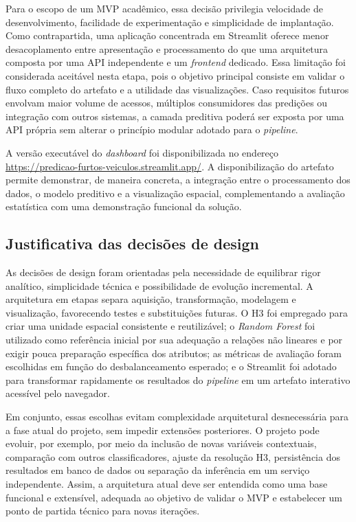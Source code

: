 \documentclass[12pt]{article}
\begin{document}
Para o escopo de um MVP acadêmico, essa decisão privilegia velocidade de desenvolvimento, facilidade de experimentação e simplicidade de implantação. Como contrapartida, uma aplicação concentrada em Streamlit oferece menor desacoplamento entre apresentação e processamento do que uma arquitetura composta por uma API independente e um \textit{frontend} dedicado. Essa limitação foi considerada aceitável nesta etapa, pois o objetivo principal consiste em validar o fluxo completo do artefato e a utilidade das visualizações. Caso requisitos futuros envolvam maior volume de acessos, múltiplos consumidores das predições ou integração com outros sistemas, a camada preditiva poderá ser exposta por uma API própria sem alterar o princípio modular adotado para o \textit{pipeline}.

A versão executável do \textit{dashboard} foi disponibilizada no endereço \url{https://predicao-furtos-veiculos.streamlit.app/}. A disponibilização do artefato permite demonstrar, de maneira concreta, a integração entre o processamento dos dados, o modelo preditivo e a visualização espacial, complementando a avaliação estatística com uma demonstração funcional da solução.

\subsection{Justificativa das decisões de design}
As decisões de design foram orientadas pela necessidade de equilibrar rigor analítico, simplicidade técnica e possibilidade de evolução incremental. A arquitetura em etapas separa aquisição, transformação, modelagem e visualização, favorecendo testes e substituições futuras. O H3 foi empregado para criar uma unidade espacial consistente e reutilizável; o \textit{Random Forest} foi utilizado como referência inicial por sua adequação a relações não lineares e por exigir pouca preparação específica dos atributos; as métricas de avaliação foram escolhidas em função do desbalanceamento esperado; e o Streamlit foi adotado para transformar rapidamente os resultados do \textit{pipeline} em um artefato interativo acessível pelo navegador.

Em conjunto, essas escolhas evitam complexidade arquitetural desnecessária para a fase atual do projeto, sem impedir extensões posteriores. O projeto pode evoluir, por exemplo, por meio da inclusão de novas variáveis contextuais, comparação com outros classificadores, ajuste da resolução H3, persistência dos resultados em banco de dados ou separação da inferência em um serviço independente. Assim, a arquitetura atual deve ser entendida como uma base funcional e extensível, adequada ao objetivo de validar o MVP e estabelecer um ponto de partida técnico para novas iterações.
\end{document}
